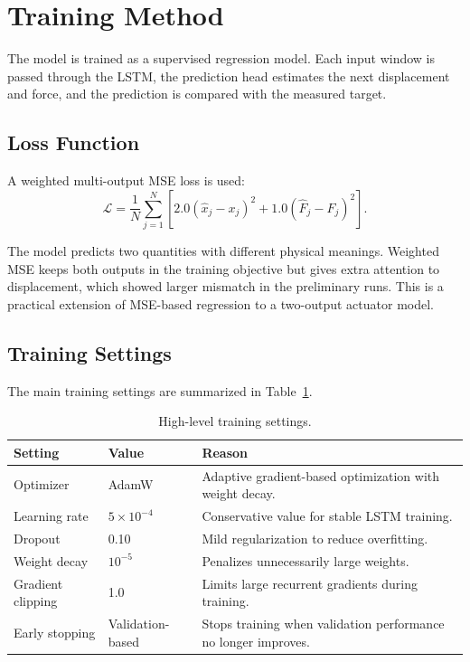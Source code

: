 \documentclass[11pt]{article}
\begin{document}
\section{Training Method}
The model is trained as a supervised regression model. Each input window is passed through the LSTM, the prediction head estimates the next displacement and force, and the prediction is compared with the measured target.

\subsection{Loss Function}
A weighted multi-output MSE loss is used:
\begin{equation}
\mathcal{L}=\frac{1}{N}\sum_{j=1}^{N}\left[2.0(\hat{x}_j-x_j)^2+1.0(\hat{F}_j-F_j)^2\right].
\end{equation}

The model predicts two quantities with different physical meanings. Weighted MSE keeps both outputs in the training objective but gives extra attention to displacement, which showed larger mismatch in the preliminary runs. This is a practical extension of MSE-based regression to a two-output actuator model.

\subsection{Training Settings}
The main training settings are summarized in Table~\ref{tab:training_summary}.

\begin{table}[H]
\centering
\small
\begin{tabular}{p{4cm}p{3cm}p{7cm}}
\toprule
Setting & Value & Reason \\
\midrule
Optimizer & AdamW & Adaptive gradient-based optimization with weight decay. \\
Learning rate & $5\times10^{-4}$ & Conservative value for stable LSTM training. \\
Dropout & 0.10 & Mild regularization to reduce overfitting. \\
Weight decay & $10^{-5}$ & Penalizes unnecessarily large weights. \\
Gradient clipping & 1.0 & Limits large recurrent gradients during training. \\
Early stopping & Validation-based & Stops training when validation performance no longer improves. \\
\bottomrule
\end{tabular}
\caption{High-level training settings.}
\label{tab:training_summary}
\end{table}
\end{document}
